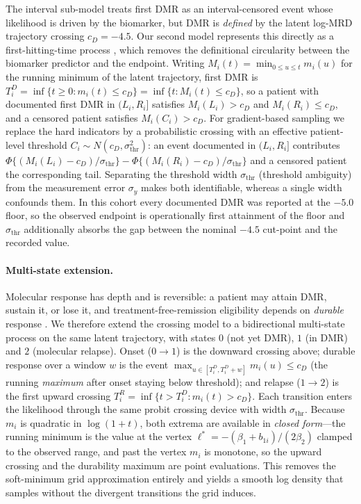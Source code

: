 \documentclass[11pt]{article}
\begin{document}
The interval sub-model treats first DMR as an interval-censored event whose
likelihood is driven by the biomarker, but DMR is \emph{defined} by the latent
log-MRD trajectory crossing $c_D=-4.5$. Our second model represents this
directly as a first-hitting-time process
\cite{LeeWhitmore2006ThresholdRegression,AalenGjessing2001ProcessView}, which
removes the definitional circularity between the biomarker predictor and the
endpoint. Writing $M_i(t)=\min_{0\le u\le t}m_i(u)$ for the running minimum of
the latent trajectory, first DMR is
$T_i^D=\inf\{t\ge 0:m_i(t)\le c_D\}=\inf\{t:M_i(t)\le c_D\}$, so a patient with
documented first DMR in $(L_i,R_i]$ satisfies $M_i(L_i)>c_D$ and
$M_i(R_i)\le c_D$, and a censored patient satisfies $M_i(C_i)>c_D$. For
gradient-based sampling we replace the hard indicators by a probabilistic
crossing with an effective patient-level threshold
$C_i\sim N(c_D,\sigma_{\mathrm{thr}}^2)$: an event documented in $(L_i,R_i]$
contributes
$\Phi\{(M_i(L_i)-c_D)/\sigma_{\mathrm{thr}}\}-\Phi\{(M_i(R_i)-c_D)/\sigma_{\mathrm{thr}}\}$
and a censored patient the corresponding tail. Separating the threshold width
$\sigma_{\mathrm{thr}}$ (threshold ambiguity) from the measurement error
$\sigma_y$ makes both identifiable, whereas a single width confounds them. In
this cohort every documented DMR was reported at the $-5.0$ floor, so the
observed endpoint is operationally first attainment of the floor and
$\sigma_{\mathrm{thr}}$ additionally absorbs the gap between the nominal $-4.5$
cut-point and the recorded value.

\paragraph{Multi-state extension.}
Molecular response has depth and is reversible: a patient may attain DMR,
sustain it, or lose it, and treatment-free-remission eligibility depends on
\emph{durable} response \cite{Li2014TKIEfficacy,Hanfstein2012EMR}. We therefore
extend the crossing model to a bidirectional multi-state process on the same
latent trajectory, with states $0$ (not yet DMR), $1$ (in DMR) and $2$
(molecular relapse). Onset ($0\to1$) is the downward crossing above; durable
response over a window $w$ is the event $\max_{u\in[T_i^D,T_i^D+w]}m_i(u)\le c_D$
(the running \emph{maximum} after onset staying below threshold); and relapse
($1\to2$) is the first upward crossing
$T_i^R=\inf\{t>T_i^D:m_i(t)>c_D\}$. Each transition enters the likelihood
through the same probit crossing device with width $\sigma_{\mathrm{thr}}$.
Because $m_i$ is quadratic in $\log(1+t)$, both extrema are available in
\emph{closed form}---the running minimum is the value at the vertex
$\ell^\ast=-(\beta_1+b_{1i})/(2\beta_2)$ clamped to the observed range, and past
the vertex $m_i$ is monotone, so the upward crossing and the durability maximum
are point evaluations. This removes the soft-minimum grid approximation
entirely and yields a smooth log density that samples without the divergent
transitions the grid induces.
\end{document}
